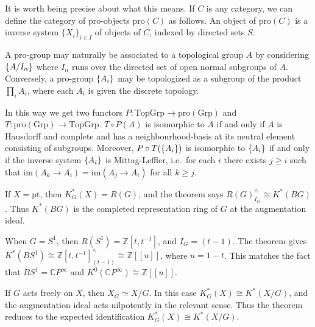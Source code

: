 \documentclass[12pt]{article}
\begin{document}
It is worth being precise about what this means. If $C$ is any category, we can define the category of pro-objects $\mathrm{pro}(C)$ as follows. An object of $\mathrm{pro}(C)$ is a inverse system $\{X_i\}_{i\in I}$ of objects of $C$, indexed by directed sets $S$. 

A pro-group may naturally be associated to a topological group $A$ by considering $\{A/I_\alpha\}$ where $I_\alpha$ runs over the directed set of open normal subgroups of $A$. Conversely, a pro-group $\{A_i\}$ may be topologized as a subgroup of the product $\prod_i A_i$, where each $A_i$ is given the discrete topology. 

In this way we get two functors $P:\mathrm{TopGrp}\to\mathrm{pro}(\mathrm{Grp})$ and $T:\mathrm{pro}(\mathrm{Grp})\to\mathrm{TopGrp}$. $T\circ P(A)$ is isomorphic to $A$ if and only if $A$ is Hausdorff and complete and has a neighbourhood-basis at its neutral element consisting of subgroups. Moreover, $P \circ T(\{A_i\})$ is isomorphic to $\{A_i\}$ if and only if the inverse system $\{A_i\}$ is Mittag-Leffler, i.e.\ for each $i$ there exists $j\ge i$ such that $\mathrm{im}(A_k\to A_i)=\mathrm{im}(A_j\to A_i)$ for all $k\ge j$.

\begin{example}
If $X=\mathrm{pt}$, then $K_G^*(X)=R(G)$, and the theorem says
$R(G)^{\wedge}_{I_G}\cong K^*(BG)$.
Thus $K^*(BG)$ is the completed representation ring of $G$ at the augmentation
ideal.
\end{example}

\begin{example}
When $G=S^1$, then $R(S^1)=\mathbb Z[t,t^{-1}]$, and
$I_G=(t-1)$. The theorem gives
$K^*(BS^1)\cong \mathbb Z[t,t^{-1}]^{\wedge}_{(t-1)}\cong \mathbb Z[[u]]$,
where $u=1-t$. This matches the fact that $BS^1=\mathbb CP^\infty$ and
$K^0(\mathbb CP^\infty)\cong \mathbb Z[[u]]$.
\end{example} 

\begin{example}

If $G$ acts freely on $X$, then $X_G\simeq X/G$. In this case
$K_G^*(X)\cong K^*(X/G)$, and the augmentation ideal acts nilpotently in the
relevant sense. Thus the theorem reduces to the expected identification
$K_G^*(X)\cong K^*(X/G)$.
\end{example}
\end{document}
